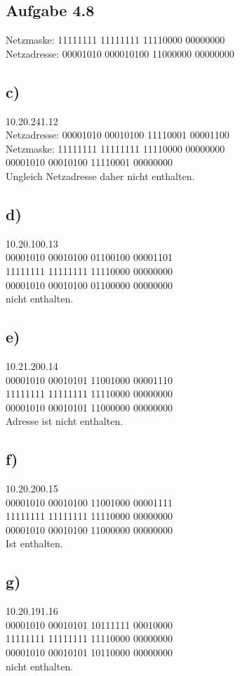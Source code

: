 \documentclass{article}
\begin{document}
	\subsection*{Aufgabe 4.8}
	Netzmaske: 11111111 11111111 11110000 00000000 \\
	Netzadresse: 00001010 000010100 11000000 00000000
	\subsection*{c)}
	10.20.241.12 \\
	Netzadresse: 00001010 00010100 11110001 00001100 \\
	Netzmaske: 11111111 11111111 11110000 00000000 \\
	00001010 00010100 11110001 00000000 \\
	Ungleich Netzadresse daher nicht enthalten. 
	\subsection*{d)}
	10.20.100.13 \\
	00001010 00010100 01100100 00001101 \\
	11111111 11111111 11110000 00000000 \\
	00001010 00010100 01100000 00000000 \\
	nicht enthalten.
	\subsection*{e)}
	10.21.200.14 \\
	00001010 00010101 11001000 00001110 \\
	11111111 11111111 11110000 00000000 \\
	00001010 00010101 11000000 00000000 \\
	Adresse ist nicht enthalten.
	\subsection*{f)}
	10.20.200.15 \\
	00001010 00010100 11001000 00001111 \\
	11111111 11111111 11110000 00000000 \\
	00001010 00010100 11000000 00000000 \\
	Ist enthalten.
	\subsection*{g)}
	10.20.191.16 \\
	00001010 00010101 10111111 00010000 \\
	11111111 11111111 11110000 00000000 \\
	00001010 00010101 10110000 00000000 \\ 
	nicht enthalten.
\end{document}
